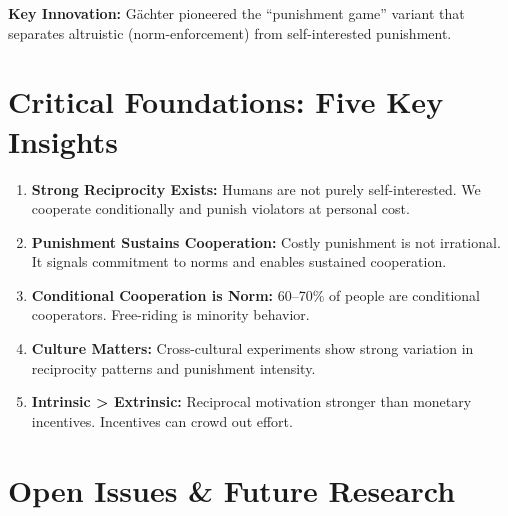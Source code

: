\documentclass[11pt]{article}
\begin{document}
\textbf{Key Innovation:} Gächter pioneered the ``punishment game'' variant that
separates altruistic (norm-enforcement) from self-interested punishment.

\section*{Critical Foundations: Five Key Insights}

\begin{enumerate}
    \item \textbf{Strong Reciprocity Exists:} Humans are not purely self-interested.
          We cooperate conditionally and punish violators at personal cost.

    \item \textbf{Punishment Sustains Cooperation:} Costly punishment is not irrational.
          It signals commitment to norms and enables sustained cooperation.

    \item \textbf{Conditional Cooperation is Norm:} 60–70\% of people are
          conditional cooperators. Free-riding is minority behavior.

    \item \textbf{Culture Matters:} Cross-cultural experiments show strong variation
          in reciprocity patterns and punishment intensity.

    \item \textbf{Intrinsic > Extrinsic:} Reciprocal motivation stronger than
          monetary incentives. Incentives can crowd out effort.
\end{enumerate}

\section*{Open Issues \& Future Research}
\end{document}
